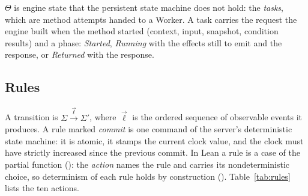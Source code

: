 $\Theta$ is engine state that the persistent state machine does not hold:
the \emph{tasks}, which are method attempts handed to a Worker. A task
carries the request the engine built when the method started (context,
input, snapshot, condition results) and a phase: \emph{Started},
\emph{Running} with the effects still to emit and the response, or
\emph{Returned} with the response.

\subsection{Rules}
\label{sec:dex-rules}

A transition is $\Sigma \xrightarrow{\;\vec{\ell}\;} \Sigma'$, where
$\vec{\ell}$ is the ordered sequence of observable events it produces. A
rule marked \emph{commit} is one command of the server's deterministic
state machine: it is atomic, it stamps the current clock value, and the
clock must have strictly increased since the previous commit. In Lean a rule
is a case of the partial function
 (): the \emph{action} names the rule and
carries its nondeterministic choice, so determinism of each rule holds by
construction (). Table~\ref{tab:rules} lists the
ten actions.


